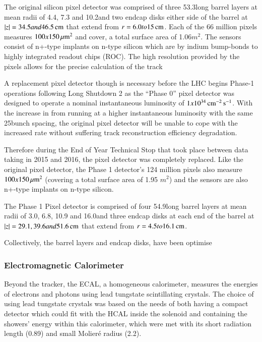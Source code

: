 The original silicon pixel detector was comprised of three 53.3\cm long barrel layers at mean radii of 4.4, 7.3 and 10.2\cm and two endcap disks either side of the barrel at $|z| = 34.5 and 46.5\,\text{cm}$ that extend from $r = 6.0 to 15\,\text{cm}$.
Each of the 66 million pixels measures $100x150\,\mu\text{m}^{2}$ and cover, a total surface area of 1.06$m^{2}$.
The sensors consist of n+-type implants on n-type silicon which are by indium bump-bonds to highly integrated readout chips (ROC).
The high resolution provided by the pixels allows for the precise calculation of the track 

A replacement pixel detector though is necessary before the LHC begins Phase-1 operations following Long Shutdown 2\cite{CMS:2012sda} as the ``Phase 0'' pixel detector was designed to operate a nominal instantaneous luminosity of $1x10^{34}\,\text{cm}^\text{$-$2}\,\text{s}^\text{$-$1}$.
With the increase in \PU from running at a higher instantaneous luminosity with the same 25\ns bunch spacing, the original pixel detector will be unable to cope with the increased rate without suffering track reconstruction efficiency degradation.

Therefore during the End of Year Technical Stop that took place between data taking in 2015 and 2016, the pixel detector was completely replaced.
Like the original pixel detector, the Phase 1 detector's 124 million pixels also measure $100x150\,\mu\text{m}^{2}$ (covering a total surface area of 1.95 $m^{2}$) and the sensors are also n+-type implants on n-type silicon.

The Phase 1 Pixel detector is comprised of four 54.9\cm long barrel layers at mean radii of 3.0, 6.8, 10.9 and 16.0\cm and three endcap disks at each end of the barrel at $|z| = 29.1, 39.6 and 51.6\,\text{cm}$ that extend from $r = 4.5 to 16.1\,\text{cm}$.

Collectively, the barrel layers and endcap disks, have been optimise


\subsubsection{Electromagnetic Calorimeter}
Beyond the tracker, the ECAL, a homogeneous calorimeter, measures the energies of electrons and photons using lead tungstate scintillating crystals. 
The choice of using lead tungstate crystals was based on the needs of both having a compact detector which could fit with the HCAL inside the solenoid and containing the showers' energy within this calorimeter, which were met with its short radiation length (0.89\cm) and small Molier\'{e} radius (2.2\cm).

